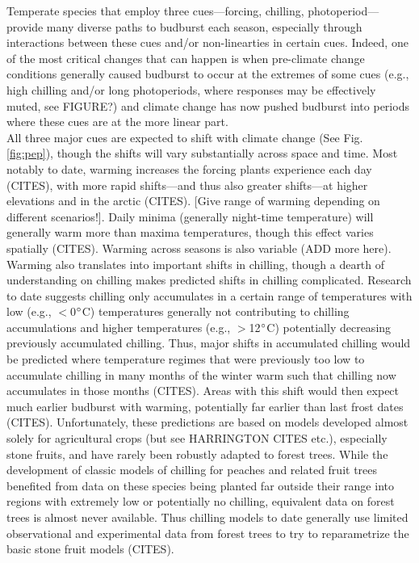 \documentclass[11pt,letter]{article}
\begin{document}
Temperate species that employ three cues---forcing, chilling, photoperiod---provide many diverse paths to budburst each season, especially through interactions between these cues and/or non-linearties in certain cues. Indeed, one of the most critical changes that can happen is when pre-climate change conditions generally caused budburst to occur at the extremes of some cues (e.g., high chilling and/or long photoperiods, where responses may be effectively muted, see FIGURE?) and climate change has now pushed budburst into periods where these cues are at the more linear part.\\ %

All three major cues are expected to shift with climate change (See Fig. \ref{fig:pep}), though the shifts will vary substantially across space and time. Most notably to date, warming increases the forcing plants experience each day (CITES), with more rapid shifts---and thus also greater shifts---at higher elevations and in the arctic (CITES). [Give range of warming depending on different scenarios!]. Daily minima (generally night-time temperature) will generally warm more than maxima temperatures, though this effect varies spatially (CITES). Warming across seasons is also variable (ADD more here). \\
Warming also translates into important shifts in chilling, though a dearth of understanding on chilling makes predicted shifts in chilling complicated. Research to date suggests chilling only accumulates in a certain range of temperatures with low (e.g., $<$0$\degree$C) temperatures generally not contributing to chilling accumulations and higher temperatures (e.g., $>$12$\degree$C) potentially decreasing previously accumulated chilling. Thus, major shifts in accumulated chilling would be predicted where temperature regimes that were previously too low to accumulate chilling in many months of the winter warm such that chilling now accumulates in those months (CITES). Areas with this shift would then expect much earlier budburst with warming, potentially far earlier than last frost dates (CITES). Unfortunately, these predictions are based on models developed almost solely for agricultural crops (but see HARRINGTON CITES etc.), especially stone fruits, and have rarely been robustly adapted to forest trees. While the development of classic models of chilling for peaches and related fruit trees benefited from data on these species being planted far outside their range into regions with extremely low or potentially no chilling, equivalent data on forest trees is almost never available. Thus chilling models to date generally use limited observational and experimental data from forest trees to try to reparametrize the basic stone fruit models (CITES).\\
\end{document}

